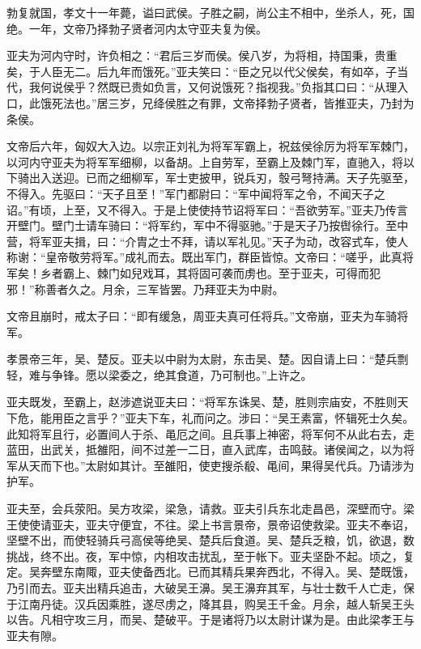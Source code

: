 \documentclass[12pt,UTF8]{ctexbook}
\begin{document}
勃复就国，孝文十一年薨，谥曰武侯。子胜之嗣，尚公主不相中，坐杀人，死，国绝。一年，文帝乃择勃子贤者河内太守亚夫复为侯。



亚夫为河内守时，许负相之：“君后三岁而侯。侯八岁，为将相，持国秉，贵重矣，于人臣无二。后九年而饿死。”亚夫笑曰：“臣之兄以代父侯矣，有如卒，子当代，我何说侯乎？然既已贵如负言，又何说饿死？指视我。”负指其口曰：“从理入口，此饿死法也。”居三岁，兄绛侯胜之有罪，文帝择勃子贤者，皆推亚夫，乃封为条侯。



文帝后六年，匈奴大入边。以宗正刘礼为将军军霸上，祝兹侯徐厉为将军军棘门，以河内守亚夫为将军军细柳，以备胡。上自劳军，至霸上及棘门军，直驰入，将以下骑出入送迎。已而之细柳军，军士吏披甲，锐兵刃，彀弓弩持满。天子先驱至，不得入。先驱曰：“天子且至！”军门都尉曰：“军中闻将军之令，不闻天子之诏。”有顷，上至，又不得入。于是上使使持节诏将军曰：“吾欲劳军。”亚夫乃传言开壁门。壁门士请车骑曰：“将军约，军中不得驱驰。”于是天子乃按辔徐行。至中营，将军亚夫揖，曰：“介胄之士不拜，请以军礼见。”天子为动，改容式车，使人称谢：“皇帝敬劳将军。”成礼而去。既出军门，群臣皆惊。文帝曰：“嗟乎，此真将军矣！乡者霸上、棘门如兒戏耳，其将固可袭而虏也。至于亚夫，可得而犯邪！”称善者久之。月余，三军皆罢。乃拜亚夫为中尉。



文帝且崩时，戒太子曰：“即有缓急，周亚夫真可任将兵。”文帝崩，亚夫为车骑将军。



孝景帝三年，吴、楚反。亚夫以中尉为太尉，东击吴、楚。因自请上曰：“楚兵剽轻，难与争锋。愿以梁委之，绝其食道，乃可制也。”上许之。



亚夫既发，至霸上，赵涉遮说亚夫曰：“将军东诛吴、楚，胜则宗庙安，不胜则天下危，能用臣之言乎？”亚夫下车，礼而问之。涉曰：“吴王素富，怀辑死士久矣。此知将军且行，必置间人于杀、黾厄之间。且兵事上神密，将军何不从此右去，走蓝田，出武关，抵雒阳，间不过差一二日，直入武库，击鸣鼓。诸侯闻之，以为将军从天而下也。”太尉如其计。至雒阳，使吏搜杀殽、黾间，果得吴代兵。乃请涉为护军。



亚夫至，会兵荥阳。吴方攻梁，梁急，请救。亚夫引兵东北走昌邑，深壁而守。梁王使使请亚夫，亚夫守便宜，不往。梁上书言景帝，景帝诏使救梁。亚夫不奉诏，坚壁不出，而使轻骑兵弓高侯等绝吴、楚兵后食道。吴、楚兵乏粮，饥，欲退，数挑战，终不出。夜，军中惊，内相攻击扰乱，至于帐下。亚夫坚卧不起。顷之，复定。吴奔壁东南陬，亚夫使备西北。已而其精兵果奔西北，不得入。吴、楚既饿，乃引而去。亚夫出精兵追击，大破吴王濞。吴王濞弃其军，与壮士数千人亡走，保于江南丹徒。汉兵因乘胜，遂尽虏之，降其县，购吴王千金。月余，越人斩吴王头以告。凡相守攻三月，而吴、楚破平。于是诸将乃以太尉计谋为是。由此梁孝王与亚夫有隙。
\end{document}
